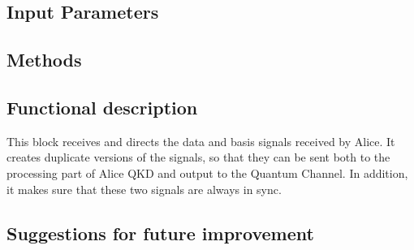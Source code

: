 

\subsection*{Input Parameters}

\subsection*{Methods}

\subsection*{Functional description}
This block receives and directs the data and basis signals received by Alice. It
creates duplicate versions of the signals, so that they can be sent both to the
processing part of Alice QKD and output to the Quantum Channel. In addition, it
makes sure that these two signals are always in sync.

\subsection*{Suggestions for future improvement}